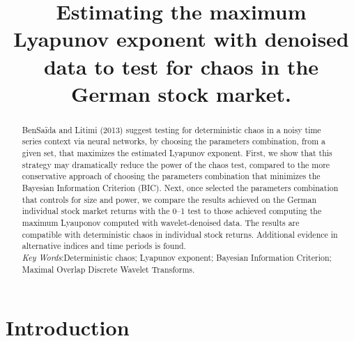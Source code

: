 \documentclass[12pt]{article}
\date{}
\title{Estimating the maximum Lyapunov exponent with denoised data to test for chaos in the German stock market.}
\begin{document}
\maketitle

\begin{abstract}
    

BenSa\"{i}da and Litimi (2013) suggest testing for deterministic
chaos in a noisy time series context via neural networks, by choosing the
parameters combination, from a given set, that maximizes the estimated 
Lyapunov exponent. First, we show that this strategy may dramatically reduce the power 
of the chaos test, compared to the more conservative approach of choosing
the parameters combination that minimizes the Bayesian Information Criterion (BIC). Next, once selected
the parameters combination that controls for size and power, we compare the results achieved on
the German individual stock market returns with the 0--1 test to those achieved computing the maximum Lyauponov computed with 
wavelet-denoised data. The results are compatible with deterministic chaos in individual stock returns. Additional evidence in alternative 
indices and time periods is found.\\  

\noindent \textit{Key Words}:Deterministic chaos; Lyapunov exponent; Bayesian Information Criterion; Maximal Overlap Discrete Wavelet Transforms.\\

        
    
\end{abstract}

\newpage

\section{Introduction\label{sec:intro}}
\end{document}
